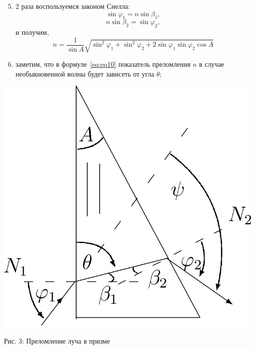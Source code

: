 \documentclass[12pt]{article}
\begin{document}
\begin{enumerate}
\begin{enumerate}
            \hspace{-1.15cm}
            \begin{minipage}{0.78\linewidth}
                \begin{enumerate}
                    [label=(\alph*)]
                    \setcounter{enumiii}{4}
                    \item 2 раза воспользуемся законом Снелла:
                    \[\sin \varphi_1 = n \sin \beta_1,\]
                    \[n\sin \beta_2 = \sin \varphi_2,\]
                    и получим,
                    \begin{equation}
                        n = \frac{1}{\sin A}\sqrt{\sin^2\varphi_1 + \sin^2\varphi_2 +
                        2\sin\varphi_1\sin\varphi_2\cos A}
                        \label{eq:eq10}
                    \end{equation}
                    \item заметим, что в формуле~\eqref{eq:eq10} показатель преломления $n$ в
                    случае необыкновенной волны будет зависеть от угла $\theta$;
                \end{enumerate}
            \end{minipage}
            \hfill
            \begin{minipage}{0.25\linewidth}
                \includegraphics[width=\linewidth]{pic/prism}
                \caption{Рис. 3: Преломление луча в призме}
                \label{fig:fig3}
            \end{minipage}
            \setcounter{enumii}{6}


\end{enumerate}
\end{enumerate}
\end{document}
